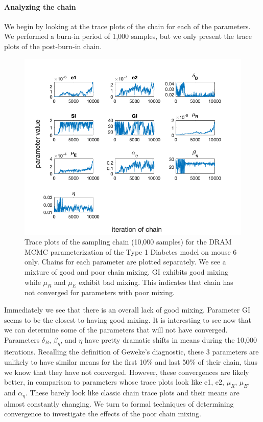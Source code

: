 \paragraph{Analyzing the chain}
We begin by looking at the trace plots of the chain for each of the parameters. We performed a burn-in period of 1,000 samples, but we only present the trace plots of the post-burn-in chain.
\begin{figure}[H]
    \centering
    \includegraphics[width=15cm]{MCMC_figs/dram_t1d_final/final_dram_mouse6_traceplots.png}
    \caption{Trace plots of the sampling chain (10,000 samples) for the DRAM MCMC parameterization of the Type 1 Diabetes model on mouse 6 only. Chains for each parameter are plotted separately. We see a mixture of good and poor chain mixing. GI exhibits good mixing while $\mu_R$ and $\mu_E$ exhibit bad mixing. This indicates that chain has not converged for parameters with poor mixing.}
    \label{fig:18mcmc}
\end{figure}
Immediately we see that there is an overall lack of good mixing. Parameter GI seems to be the closest to having good mixing. It is interesting to see now that we can determine some of the parameters that will not have converged. Parameters $\delta_B$, $\beta_{\eta}$, and $\eta$ have pretty dramatic shifts in means during the 10,000 iterations. Recalling the definition of Geweke's diagnostic, these 3 parameters are unlikely to have similar means for the first 10\% and last 50\% of their chain, thus we know that they have not converged. However, these convergences are likely better, in comparison to parameters whose trace plots look like e1, e2, $\mu_R$, $\mu_E$, and $\alpha_{\eta}$. These barely look like classic chain trace plots and their means are almost constantly changing. We turn to formal techniques of determining convergence to investigate the effects of the poor chain mixing.
